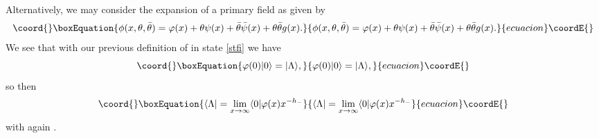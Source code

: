 \documentclass[a4paper,12pt]{article}
\def\thetabar    {\bar{\theta}}
\begin{document}
Alternatively, we may consider the expansion of a primary field as given by
\begin{equation}\coord{}\boxEquation{
\phi(x,\theta,\thetabar)=\varphi(x)+\theta\psi(x)+
\thetabar\bar{\psi}(x)+\theta\thetabar g(x). 
}{
\phi(x,\theta,\thetabar)=\varphi(x)+\theta\psi(x)+
\thetabar\bar{\psi}(x)+\theta\thetabar g(x). 
}{ecuacion}\coordE{}\end{equation}
We see that with our previous definition of in state \eqref{stfi} we have 
\begin{equation}\coord{}\boxEquation{
\varphi(0)|0 \rangle = |\Lambda \rangle,
}{
\varphi(0)|0 \rangle = |\Lambda \rangle,
}{ecuacion}\coordE{}\end{equation}
so then
\begin{equation}\coord{}\boxEquation{
\langle \Lambda |=\lim_{x \rightarrow \infty}\langle 0 |\varphi(x)
x^{-h_-}
}{
\langle \Lambda |=\lim_{x \rightarrow \infty}\langle 0 |\varphi(x)
x^{-h_-}
}{ecuacion}\coordE{}\end{equation}
with again \myHighlight{$\theta=\thetabar=0$}\coordHE{}.
\end{document}

